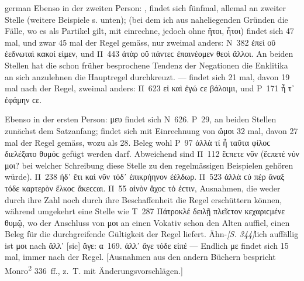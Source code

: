 \begin{otherlanguage*}{german}
Ebenso in der zweiten Person: ,  findet sich fünfmal, allemal an zweiter Stelle (weitere Beispiele s. unten);  (bei dem ich aus naheliegenden Gründen die Fälle, wo es als Partikel gilt, mit einrechne, jedoch ohne ἤτοι, ἦτοι) findet sich 47 mal, und zwar 45 mal der Regel gemäss, nur zweimal anders: Ν~382 ἐπεὶ οὔ  ἐεδνωταὶ κακοί εἰμεν, und Π~443 ἀτὰρ οὔ  πάντεϲ ἐπαινέομεν θεοὶ ἄλλοι. An beiden Stellen hat die schon früher besprochene Tendenz der Negationen die Enklitika an sich anzulehnen die Hauptregel durchkreuzt. —  findet sich 21 mal, davon 19 mal nach der Regel, zweimal anders: Π~623 εἰ καὶ ἐγώ ϲε βάλοιμι, und Ρ~171 ἦ τ᾽ ἐφάμην ϲε.

Ebenso in der ersten Person: μευ findet sich Ν~626. Ρ~29, an beiden Stellen zunächst dem Satzanfang;  findet sich mit Einrechnung von ὤμοι 32 mal, davon 27 mal der Regel gemäss, wozu als 28. Beleg wohl Ρ~97 ἀλλὰ τί ἦ  ταῦτα φίλοϲ διελέξατο θυμόϲ gefügt werden darf. Abweichend sind Π~112 ἕϲπετε νῦν  (ἕϲπετέ νύν μοι? bei welcher Schreibung diese Stelle zu den regelmässigen Beispielen gehören würde). Π~238 ἠδ᾽ ἔτι καὶ νῦν  τόδ᾽ ἐπικρήηνον ἐέλδωρ. Π~523 ἀλλὰ ϲύ πέρ  ἄναξ τόδε καρτερὸν ἕλκοϲ ἄκεϲϲαι. Π~55 αἰνὸν ἄχοϲ τό  ἐϲτιν, Ausnahmen, die weder durch ihre Zahl noch durch ihre Beschaffenheit die Regel erschüttern können, während umgekehrt eine Stelle wie Τ~287 Πάτροκλέ  δειλῇ πλεῖϲτον κεχαριϲμένε θυμῷ, wo der Anschluss von μοι an einen Vokativ schon den Alten auffiel, einen Beleg für die durchgreifende Gültigkeit der Regel liefert. Ähn-\hypertarget{p344}{\emph{[S. 344]}}\label{p344}lich auffällig ist μοι nach ἄλλ᾽ [sic] ἄγε: α~169. ἀλλ᾽ ἄγε  τόδε εἰπέ — Endlich με findet sich 15 mal, immer nach der Regel. [Ausnahmen aus den andern Büchern bespricht Monro\textsuperscript{2} 336~ff., z.~T. mit Änderungsvorschlägen.]


\end{otherlanguage*}
